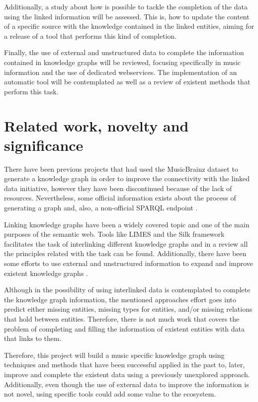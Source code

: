 \documentclass[paper=a4,fontsize=11pt]{scrartcl}
\numberwithin{equation}{section}		%
\numberwithin{figure}{section}			%
\numberwithin{table}{section}				%
\begin{document}
Additionally, a study about how is possible to tackle the completion of the data using the linked information will be assessed.
This is, how to update the content of a specific source with the knowledge contained in the linked entities, aiming for a release of a tool that performs this kind of completion.

Finally, the use of external and unstructured data to complete the information contained in knowledge graphs will be reviewed, focusing specifically in music information and the use of dedicated webservices.
The implementation of an automatic tool will be contemplated as well as a review of existent methods that perform this task.

\section{Related work, novelty and significance}
There have been previous projects that had used the MusicBrainz dataset to generate a knowledge graph in order to improve the connectivity with the linked data initiative, however they have been discontinued because of the lack of resources. 
Nevertheless, some official information exists about the process of generating a graph \cite{musicbrainz_rdf} and, also, a non-official SPARQL endpoint \cite{musicbrainz_endpoint}.

Linking knowledge graphs have been a widely covered topic and one of the main purposes of the semantic web. Tools like LIMES \cite{limes} and the Silk framework \cite{silk} facilitates the task of interlinking different knowledge graphs and in \cite{linking_book} a review all the principles related with the task can be found. Additionally, there have been some efforts to use external and unstructured information to expand and improve existent knowledge graphs \cite{completion_open, base_population, minte}.

Although in \cite{refinement_survey} the possibility of using interlinked data is contemplated to complete the knowledge graph information, the mentioned approaches effort goes into predict either missing entities, missing types for entities, and/or missing relations that hold between entities. Therefore, there is not much work that covers the problem of completing and filling the information of existent entities with data that links to them. 

Therefore, this project will build a music specific knowledge graph using techniques and methods that have been successful applied in the past to, later, improve and complete the existent data using a previously unexplored approach. 
Additionally, even though the use of external data to improve the information is not novel, using specific tools could add some value to the ecosystem.
\end{document}
